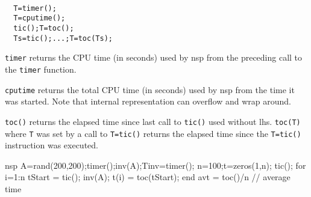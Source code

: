 \begin{mandesc}
   \\
    \\ 
   \\
\end{mandesc}
\begin{calling_sequence}
\begin{verbatim}
  T=timer();
  T=cputime();
  tic();T=toc();
  Ts=tic();...;T=toc(Ts);
\end{verbatim}
\end{calling_sequence}
\begin{mandescription}
\noindent\verb!timer!  returns the CPU time (in seconds) used by nsp from the 
  preceding call to the \verb!timer! function. 

\noindent\verb!cputime! returns the total CPU time (in seconds) used by nsp 
  from the time it was started. Note that internal representation
  can overflow and wrap around.

\noindent\verb!toc()! returns the elapsed time since last call to \verb!tic()!
  used without lhs. \verb!toc(T)! where \verb!T! was set by a call to 
  \verb!T=tic()! returns the elapsed time since the \verb!T=tic()! 
  instruction was executed. 
\end{mandescription}
\begin{examples}
  \begin{mintednsp}{nsp}
    A=rand(200,200);timer();inv(A);Tinv=timer();
    n=100;t=zeros(1,n);
    tic();
    for i=1:n 
      tStart = tic();
      inv(A);
      t(i) = toc(tStart);
    end
    avt = toc()/n // average time 
  \end{mintednsp}
\end{examples}

